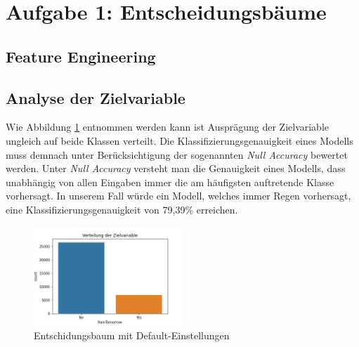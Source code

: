\section{Aufgabe 1: Entscheidungsbäume}
\subsection{Feature Engineering}

\subsection{Analyse der Zielvariable}
Wie Abbildung \ref{fig:disc_target_variable} entnommen werden kann ist Ausprägung der Zielvariable ungleich auf beide Klassen verteilt. Die Klassifizierungsgenauigkeit eines Modells muss demnach unter Berücksichtigung der sogenannten \emph{Null Accuracy} bewertet werden. Unter \emph{Null Accuracy} versteht man die Genauigkeit eines Modells, dass unabhängig von allen Eingaben immer die am häufigsten auftretende Klasse vorhersagt. In unserem Fall würde ein Modell, welches immer Regen vorhersagt, eine Klassifizierungsgenauigkeit von 79,39\% erreichen.

\begin{figure}[h]
	\centering
	\includegraphics[width = 0.5\textwidth]{Bilder/distribution_target_variable}
	\caption{Entschidungsbaum mit Default-Einstellungen}
	\label{fig:disc_target_variable}
\end{figure}

